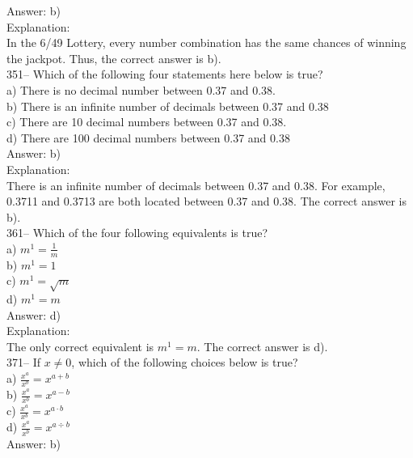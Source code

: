 \documentclass[letterpaper, 12pt]{article}
\begin{document}
Answer: b)\\

Explanation: \\
In the 6/49 Lottery, every number combination has the same chances of winning the jackpot.
Thus, the correct answer is b).\\




351-- Which of the following four statements here below is true?\\
a) There is no decimal number between 0.37 and 0.38.\\
b) There is an infinite number of decimals between 0.37 and 0.38\\
c) There are 10 decimal numbers between 0.37 and 0.38.\\
d) There are 100 decimal numbers between 0.37 and 0.38\\

Answer: b)\\

Explanation:\\
There is an infinite number of decimals between 0.37 and 0.38.
For example, 0.3711 and 0.3713 are both located between 0.37 and 0.38.
The correct answer is b).\\


361-- Which of the four following equivalents is true?\\

a) $m^{1}=\frac{1}{m}$\\[2mm]
b) $m^{1}=1$\\[2mm]
c) $m^{1}=\sqrt{m}$\\[2mm]
d) $m^{1}=m$ \\

Answer: d)\\

Explanation: \\
The only correct equivalent is $m^{1}=m$.  The correct answer is d).\\


371-- If $x\neq0$, which of the following choices below is true?\\

a) $\frac{x^{a}}{x^{b}}=x^{a+b}$\\[2mm]
b) $\frac{x^{a}}{x^{b}}=x^{a-b}$\\[2mm]
c) $\frac{x^{a}}{x^{b}}=x^{a\cdot b}$\\[2mm]
d) $\frac{x^{a}}{x^{b}}=x^{a\div b}$\\

Answer: b)\\
\end{document}
